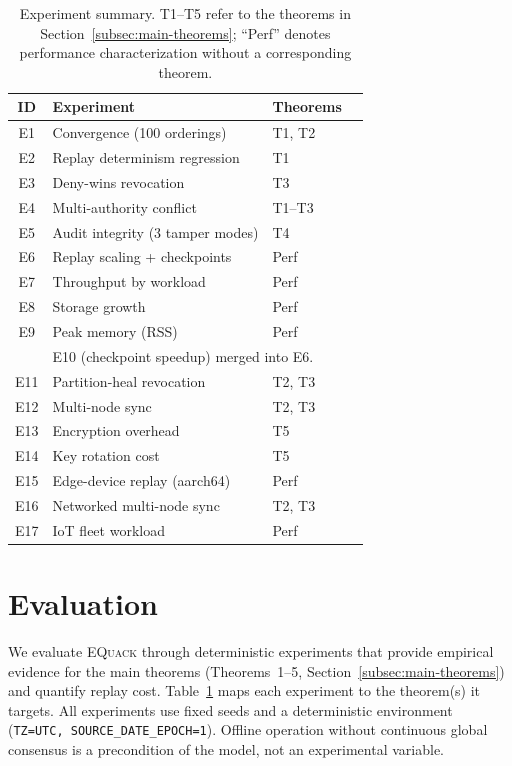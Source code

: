 \documentclass[10pt,journal,compsoc]{IEEEtran}
\newcommand{\equack}{\textsc{EQuack}}
\begin{document}
\begin{table}[!htbp]
\centering
\caption{Experiment summary. T1--T5 refer to the theorems in Section~\ref{subsec:main-theorems}; ``Perf'' denotes performance characterization without a corresponding theorem.}
\label{tab:experiment-summary}
\footnotesize
\setlength{\tabcolsep}{4pt}
\renewcommand{\arraystretch}{1.15}
\begin{tabular}{@{}clll@{}}
\toprule
\textbf{ID} & \textbf{Experiment} & \textbf{Theorems} \\
\midrule
E1  & Convergence (100 orderings)      & T1, T2  \\
E2  & Replay determinism regression    & T1      \\
E3  & Deny-wins revocation             & T3      \\
E4  & Multi-authority conflict          & T1--T3   \\
E5  & Audit integrity (3 tamper modes)  & T4      \\
E6  & Replay scaling + checkpoints      & Perf    \\
E7  & Throughput by workload            & Perf    \\
E8  & Storage growth                    & Perf    \\
E9  & Peak memory (RSS)                 & Perf    \\
    & \multicolumn{2}{l}{ E10 (checkpoint speedup) merged into E6.} \\
E11 & Partition-heal revocation         & T2, T3  \\
E12 & Multi-node sync                   & T2, T3  \\
E13 & Encryption overhead               & T5      \\
E14 & Key rotation cost                 & T5      \\
E15 & Edge-device replay (aarch64)      & Perf    \\
E16 & Networked multi-node sync         & T2, T3  \\
E17 & IoT fleet workload                & Perf    \\
\bottomrule
\end{tabular}
\end{table}

\section{Evaluation}
\label{sec:evaluation}

We evaluate \equack{} through deterministic experiments that provide
empirical evidence for the main theorems (Theorems~1--5,
Section~\ref{subsec:main-theorems}) and quantify replay cost.
Table~\ref{tab:experiment-summary} maps each experiment to the
theorem(s) it targets. All experiments use fixed seeds and a
deterministic environment (\texttt{TZ=UTC, SOURCE\_DATE\_EPOCH=1}).
Offline operation without continuous global consensus is a
precondition of the model, not an experimental variable.
\end{document}
